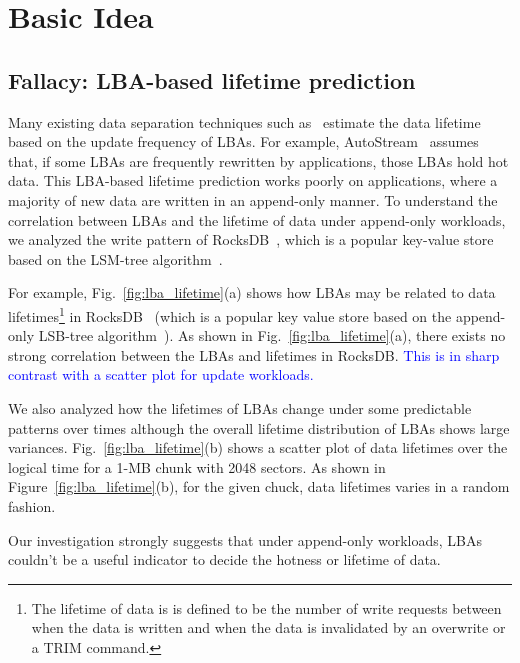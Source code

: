 \section{Basic Idea}
\subsection{Fallacy: LBA-based lifetime prediction}
Many existing data separation techniques such as~\cite{HotCold, AutoStream} 
estimate the data lifetime based on the update frequency of LBAs.  
For example, AutoStream~\cite{AutoStream} assumes that, if
some LBAs are frequently rewritten by applications, those LBAs hold hot data.
This LBA-based lifetime prediction works poorly on applications, where
a majority of new data are written in an append-only manner.  To understand
the correlation between LBAs and the lifetime of data under append-only
workloads, we analyzed the write pattern of RocksDB~\cite{RocksDB}, which is a
popular key-value store based on the LSM-tree algorithm~\cite{LSM}.

For example, Fig.~\ref{fig:lba_lifetime}(a) shows how LBAs may be related 
to data lifetimes\footnote{The lifetime of data is is defined to be 
the number of write requests between when the data is written 
and when the data is invalidated by an overwrite or a TRIM command.}
in RocksDB~\cite{RocksDB} (which is a popular key value store 
based on the append-only LSB-tree algorithm~\cite{LSM}).  
As shown in Fig.~\ref{fig:lba_lifetime}(a), 
there exists no strong correlation between the LBAs and lifetimes in RocksDB.  
\textcolor{blue}{This is in sharp contrast with a scatter plot for update workloads.}

We also analyzed 
how the lifetimes of LBAs change under some predictable patterns over times 
although the overall lifetime distribution of LBAs shows large variances.
Fig.~\ref{fig:lba_lifetime}(b) shows a scatter plot of data lifetimes over the logical time 
for a 1-MB chunk with 2048 sectors. 
As shown in Figure~\ref{fig:lba_lifetime}(b), 
for the given chuck, data lifetimes varies in a random fashion.  

Our investigation strongly suggests that  under append-only
workloads, LBAs couldn't be a useful indicator to decide
the hotness or lifetime of data.


